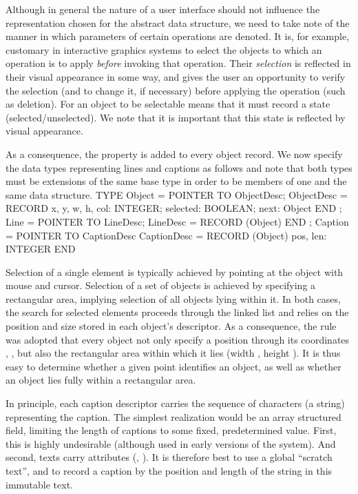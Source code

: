 Although in general the nature of a user interface should not influence the representation chosen for the abstract data structure, we need to take note of the manner in which parameters of certain operations are denoted. It is, for example, customary in interactive graphics systems to select the objects to which an operation is to apply \emph{before} invoking that operation. Their \emph{selection} is reflected in their visual appearance in some way, and gives the user an opportunity to verify the selection (and to change it, if necessary) before applying the operation (such as deletion). For an object to be selectable means that it must record a state (selected/unselected). We note that it is important that this state is reflected by visual appearance.

As a consequence, the property  is added to every object record. We now specify the data types representing lines and captions as follows and note that both types must be extensions of the same base type in order to be members of one and the same data structure.
\begintt
TYPE Object =   POINTER TO ObjectDesc;
  ObjectDesc =  RECORD
                  x, y, w, h, col: INTEGER;
                  selected: BOOLEAN;
                  next: Object
                END ;
  Line =        POINTER TO LineDesc;
  LineDesc =    RECORD (Object) END ;
  Caption =     POINTER TO CaptionDesc
  CaptionDesc = RECORD (Object)
                  pos, len: INTEGER
                END
\endtt

\noindent Selection of a single element is typically achieved by pointing at the object with mouse and cursor. Selection of a set of objects is achieved by specifying a rectangular area, implying selection of all objects lying within it. In both cases, the search for selected elements proceeds through the linked list and relies on the position and size stored in each object's descriptor. As a consequence, the rule was adopted that every object not only specify a position through its coordinates , , but also the rectangular area within which it lies (width , height ). It is thus easy to determine whether a given point identifies an object, as well as whether an object lies fully within a rectangular area.

In principle, each caption descriptor carries the sequence of characters (a string) representing the caption. The simplest realization would be an array structured field, limiting the length of captions to some fixed, predetermined value. First, this is highly undesirable (although used in early versions of the system). And second, texts carry attributes (, ). It is therefore best to use a global ``scratch text'', and to record a caption by the position and length of the string in this immutable text.

